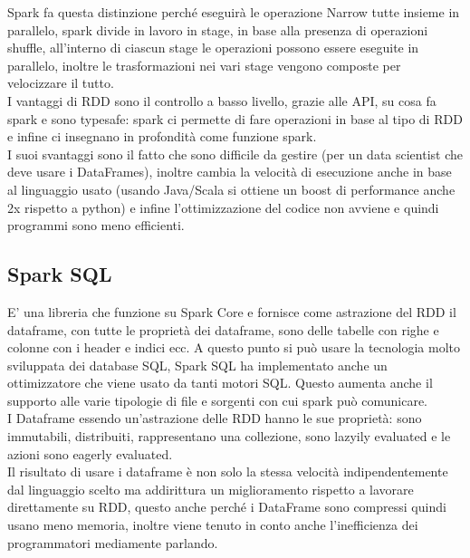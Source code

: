 \documentclass[11pt, twocolumn]{article}
\begin{document}
Spark fa questa distinzione perché eseguirà le operazione Narrow tutte insieme in parallelo, spark divide in lavoro in stage, in base alla presenza di operazioni shuffle, all'interno di ciascun stage le operazioni possono essere eseguite in parallelo, inoltre le trasformazioni nei vari stage vengono composte per velocizzare il tutto.\\
I vantaggi di RDD sono il controllo a basso livello, grazie alle API, su cosa fa spark e sono typesafe: spark ci permette di fare operazioni in base al tipo di RDD e infine ci insegnano in profondità come funzione spark.\\
I suoi svantaggi sono il fatto che sono difficile da gestire (per un data scientist che deve usare i DataFrames), inoltre cambia la velocità di esecuzione anche in base al linguaggio usato (usando Java/Scala si ottiene un boost di performance anche 2x rispetto a python) e infine l'ottimizzazione del codice non avviene e quindi programmi sono meno efficienti.\\
\subsection{Spark SQL}
E' una libreria che funzione su Spark Core e fornisce come astrazione del RDD il dataframe, con tutte le proprietà dei dataframe, sono delle tabelle con righe e colonne con i header e indici ecc.
A questo punto si può usare la tecnologia molto sviluppata dei database SQL, Spark SQL ha implementato anche un ottimizzatore che viene usato da tanti motori SQL.
Questo aumenta anche il supporto alle varie tipologie di file e sorgenti con cui spark può comunicare.\\
I Dataframe essendo un'astrazione delle RDD hanno le sue proprietà: sono immutabili, distribuiti, rappresentano una collezione, sono lazyily evaluated e le azioni sono eagerly evaluated.\\
Il risultato di usare i dataframe è non solo la stessa velocità indipendentemente dal linguaggio scelto ma addirittura un miglioramento rispetto a lavorare direttamente su RDD, questo anche perché i DataFrame sono compressi quindi usano meno memoria, inoltre viene tenuto in conto anche l'inefficienza dei programmatori mediamente parlando.
\end{document}
